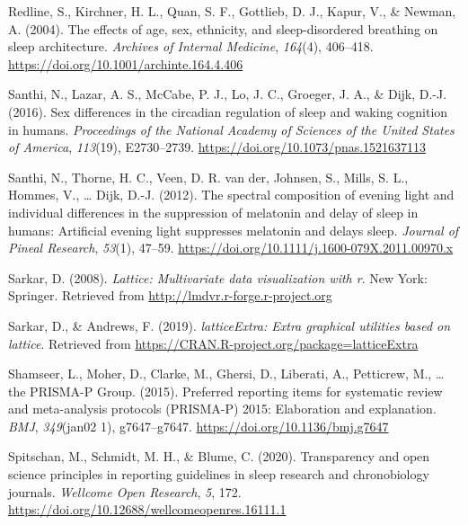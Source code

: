 \documentclass[
  english,
  jou,floatsintext]{apa6}
\newlength{\cslhangindent}
\newenvironment{CSLReferences}[2] %
 {%
  \setlength{\parindent}{0pt}
  \ifodd #1 \everypar{\setlength{\hangindent}{\cslhangindent}}\ignorespaces\fi
  \ifnum #2 > 0
  \setlength{\parskip}{#2\baselineskip}
  \fi
 }%
 {}
\begin{document}
\begin{CSLReferences}{1}{0}
\leavevmode{}%
Redline, S., Kirchner, H. L., Quan, S. F., Gottlieb, D. J., Kapur, V., \& Newman, A. (2004). The effects of age, sex, ethnicity, and sleep-disordered breathing on sleep architecture. \emph{Archives of Internal Medicine}, \emph{164}(4), 406--418. \url{https://doi.org/10.1001/archinte.164.4.406}

\leavevmode{}%
Santhi, N., Lazar, A. S., McCabe, P. J., Lo, J. C., Groeger, J. A., \& Dijk, D.-J. (2016). Sex differences in the circadian regulation of sleep and waking cognition in humans. \emph{Proceedings of the National Academy of Sciences of the United States of America}, \emph{113}(19), E2730--2739. \url{https://doi.org/10.1073/pnas.1521637113}

\leavevmode{}%
Santhi, N., Thorne, H. C., Veen, D. R. van der, Johnsen, S., Mills, S. L., Hommes, V., \ldots{} Dijk, D.-J. (2012). The spectral composition of evening light and individual differences in the suppression of melatonin and delay of sleep in humans: {Artificial} evening light suppresses melatonin and delays sleep. \emph{Journal of Pineal Research}, \emph{53}(1), 47--59. \url{https://doi.org/10.1111/j.1600-079X.2011.00970.x}

\leavevmode{}%
Sarkar, D. (2008). \emph{Lattice: Multivariate data visualization with r}. New York: Springer. Retrieved from \url{http://lmdvr.r-forge.r-project.org}

\leavevmode{}%
Sarkar, D., \& Andrews, F. (2019). \emph{latticeExtra: Extra graphical utilities based on lattice}. Retrieved from \url{https://CRAN.R-project.org/package=latticeExtra}

\leavevmode{}%
Shamseer, L., Moher, D., Clarke, M., Ghersi, D., Liberati, A., Petticrew, M., \ldots{} the PRISMA-P Group. (2015). Preferred reporting items for systematic review and meta-analysis protocols ({PRISMA}-{P}) 2015: Elaboration and explanation. \emph{BMJ}, \emph{349}(jan02 1), g7647--g7647. \url{https://doi.org/10.1136/bmj.g7647}

\leavevmode{}%
Spitschan, M., Schmidt, M. H., \& Blume, C. (2020). Transparency and open science principles in reporting guidelines in sleep research and chronobiology journals. \emph{Wellcome Open Research}, \emph{5}, 172. \url{https://doi.org/10.12688/wellcomeopenres.16111.1}


\end{CSLReferences}
\end{document}
